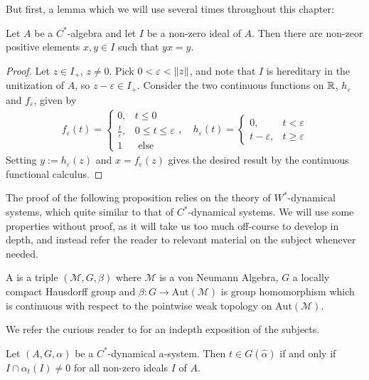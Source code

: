 But first, a lemma which we will use several times throughout this chapter:
\begin{lemma}
	Let $A$ be a $C^*$-algebra and let $I$ be a non-zero ideal of $A$. Then there are non-zeor positive elements $x,y \in I$ such that $yx = y$.
	\label{poselyx}
\end{lemma}
\begin{proof}
	Let $z \in I_+$, $z \neq 0$. Pick $0 < \varepsilon < \left\lVert z\right\rVert$, and note that $I$ is hereditary in the unitization of $A$, so $z-\varepsilon \in I_+$. Consider the two continuous functions on $\mathbb{R}$, $h_\varepsilon$ and $f_{\varepsilon}$, given by
	\begin{align*}
		f_\varepsilon(t) = \begin{cases}
			0, & t \leq 0\\
			\frac t \varepsilon, &  0 \leq t \leq \varepsilon\\
			1 & \text{ else}
		\end{cases}, \quad  h_\varepsilon(t) = \begin{cases}
			0, &  t < \varepsilon\\
			t-\varepsilon, & t \geq \varepsilon
		\end{cases}
	\end{align*}
	Setting $y := h_\varepsilon(z)$ and $x = f_\varepsilon(z)$ gives the desired result by the continuous functional calculus.
\end{proof}
\begin{remark}
	The proof of the following proposition relies on the theory of $W^*$-dynamical systems, which quite similar to that of $C^*$-dynamical systems. We will use some properties without proof, as it will take us too much off-course to develop in depth, and instead refer the reader to relevant material on the subject whenever needed.	
\begin{definition}
	A  is a triple $(\mathscr{M},G,\beta)$ where $\mathscr{M}$ is a von Neumann Algebra, $G$ a locally compact Hausdorff group and $\beta \colon G \to \mathrm{Aut}(\mathscr{M})$ is group homomorphism which is continuous with respect to the pointwise weak topology on $\mathrm{Aut}(\mathscr{M})$.
\end{definition}
	 We refer the curious reader to \cite[Chapter 7.4 and 7.10]{pedersenalgauto} for an indepth exposition of the subjects.
\end{remark}
\begin{proposition}
	Let $(A, G, \alpha)$ be a $C^*$-dynamical a-system. Then $t \in G(\hat \alpha)$ if and only if $I \cap \alpha_t(I) \neq 0$ for all non-zero ideals $I$ of $A$.
	\label{connesideal1}
\end{proposition}
